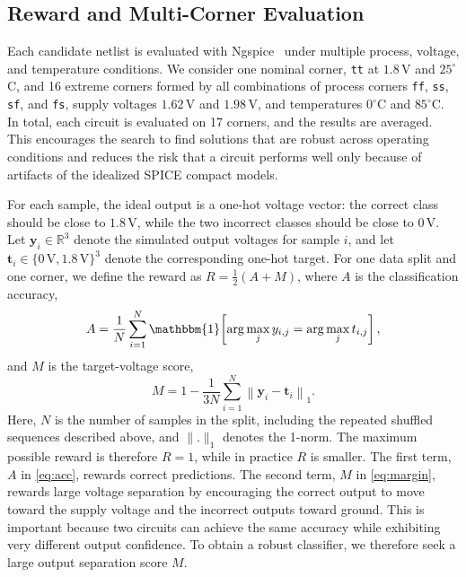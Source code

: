 \documentclass[sigconf,pbalance]{acmart_modified}
\newcommand{\squeezeSubSection}{}
\begin{document}
\squeezeSubSection\subsection{Reward and Multi-Corner Evaluation}
\label{subsec:reward_multicorner}
Each candidate netlist is evaluated with Ngspice~\cite{ngspice46} under multiple process, voltage, and temperature conditions. We consider one nominal corner, \texttt{tt} at $1.8\,$V and $25^\circ$C, and 16 extreme corners formed by all combinations of process corners \texttt{ff}, \texttt{ss}, \texttt{sf}, and \texttt{fs}, supply voltages $1.62\,$V and $1.98\,$V, and temperatures $0^\circ$C and $85^\circ$C. In total, each circuit is evaluated on 17 corners, and the results are averaged. This encourages the search to find solutions that are robust across operating conditions and reduces the risk that a circuit performs well only because of artifacts of the idealized SPICE compact models.

For each sample, the ideal output is a one-hot voltage vector: the correct class should be close to $1.8\,$V, while the two incorrect classes should be close to $0\,$V. Let $\mathbf{y}_i \in \mathbb{R}^3$ denote the simulated output voltages for sample $i$, and let $\mathbf{t}_i \in \{0\,\text{V},1.8\,\text{V}\}^3$ denote the corresponding one-hot target. For one data split and one corner, we define the reward as $R = \frac{1}{2}(A + M)$, where $A$ is the classification accuracy,
\begin{equation}
A = \frac{1}{N} \sum_{i=1}^{N} \mathbbm{1}\!\left[\arg\max_j y_{i,j} = \arg\max_j t_{i,j}\right],
\label{eq:acc}
\end{equation}
and $M$ is the target-voltage score,
\begin{equation}
M = 1 - \frac{1}{3N} \sum_{i=1}^{N} \left\lVert \mathbf{y}_i - \mathbf{t}_i \right\rVert_1.
\label{eq:margin}
\end{equation}
Here, $N$ is the number of samples in the split, including the repeated shuffled sequences described above, and $\lVert .\rVert_1$ denotes the 1-norm. The maximum possible reward is therefore $R = 1$, while in practice $R$ is smaller. The first term, $A$ in \eqref{eq:acc}, rewards correct predictions. The second term, $M$ in \eqref{eq:margin}, rewards large voltage separation by encouraging the correct output to move toward the supply voltage and the incorrect outputs toward ground. This is important because two circuits can achieve the same accuracy while exhibiting very different output confidence. To obtain a robust classifier, we therefore seek a large output separation score $M$.
\end{document}
